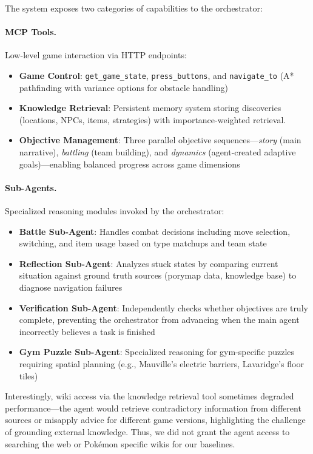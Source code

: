 The system exposes two categories of capabilities to the orchestrator:

\paragraph{MCP Tools.} Low-level game interaction via HTTP endpoints:
\begin{itemize}
    \item \textbf{Game Control}: \texttt{get\_game\_state}, \texttt{press\_buttons}, and \texttt{navigate\_to} (A* pathfinding with variance options for obstacle handling)
    \item \textbf{Knowledge Retrieval}: Persistent memory system storing discoveries (locations, NPCs, items, strategies) with importance-weighted retrieval.
    \item \textbf{Objective Management}: Three parallel objective sequences---\textit{story} (main narrative), \textit{battling} (team building), and \textit{dynamics} (agent-created adaptive goals)---enabling balanced progress across game dimensions
\end{itemize}

\paragraph{Sub-Agents.} Specialized reasoning modules invoked by the orchestrator:
\begin{itemize}
    \item \textbf{Battle Sub-Agent}: Handles combat decisions including move selection, switching, and item usage based on type matchups and team state
    \item \textbf{Reflection Sub-Agent}: Analyzes stuck states by comparing current situation against ground truth sources (porymap data, knowledge base) to diagnose navigation failures
    \item \textbf{Verification Sub-Agent}: Independently checks whether objectives are truly complete, preventing the orchestrator from advancing when the main agent incorrectly believes a task is finished
    \item \textbf{Gym Puzzle Sub-Agent}: Specialized reasoning for gym-specific puzzles requiring spatial planning (e.g., Mauville's electric barriers, Lavaridge's floor tiles)
\end{itemize}

Interestingly, wiki access via the knowledge retrieval tool sometimes degraded performance---the agent would retrieve contradictory information from different sources or misapply advice for different game versions, highlighting the challenge of grounding external knowledge. Thus, we did not grant the agent access to searching the web or Pokémon specific wikis for our baselines.

